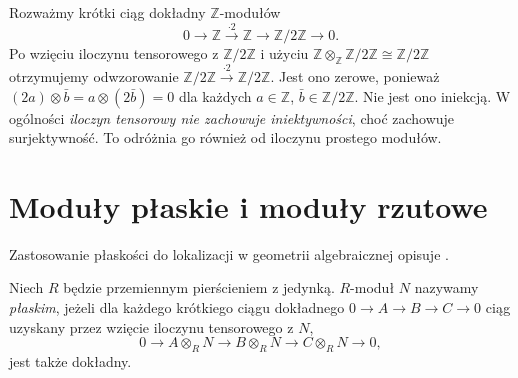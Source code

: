 \begin{przyklad}
\label{aa:prz:tensor-not-left-exact}
Rozważmy krótki ciąg dokładny $\mathbb Z$-modułów
\[
0\longrightarrow\mathbb Z\xrightarrow{\cdot2}\mathbb Z
\longrightarrow\mathbb Z/2\mathbb Z\longrightarrow0.
\]
Po wzięciu iloczynu tensorowego z $\mathbb Z/2\mathbb Z$
i użyciu $\mathbb Z\otimes_{\mathbb Z}\mathbb Z/2\mathbb Z
\cong\mathbb Z/2\mathbb Z$ otrzymujemy odwzorowanie
$\mathbb Z/2\mathbb Z\xrightarrow{\cdot2}
\mathbb Z/2\mathbb Z$. Jest ono zerowe, ponieważ
$(2a)\otimes\bar b=a\otimes(2\bar b)=0$ dla
każdych $a\in\mathbb Z$, $\bar b\in\mathbb Z/2\mathbb Z$.
Nie jest ono iniekcją. W ogólności \emph{iloczyn tensorowy
nie zachowuje iniektywności}, choć zachowuje surjektywność.
To odróżnia go również od iloczynu prostego modułów.
\end{przyklad}

\section{Moduły płaskie i moduły rzutowe}
Zastosowanie płaskości do lokalizacji w geometrii algebraicznej opisuje
.

\begin{definicja}
\label{aa:def:flat-module}
Niech $R$ będzie przemiennym pierścieniem z jedynką.
$R$-moduł $N$ nazywamy \emph{płaskim}, jeżeli dla
każdego krótkiego ciągu dokładnego
$0\to A\to B\to C\to0$ ciąg uzyskany przez
wzięcie iloczynu tensorowego z $N$,
\[
0\longrightarrow A\otimes_RN\longrightarrow B\otimes_RN
\longrightarrow C\otimes_RN\longrightarrow0,
\]
jest także dokładny.
\end{definicja}

